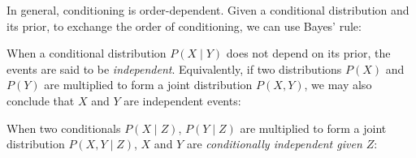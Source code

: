 \documentclass[11pt]{article}
\begin{document}
    \noindent In general, conditioning is order-dependent. Given a conditional distribution and its prior, to exchange the order of conditioning, we can use Bayes' rule:

    \begin{prooftree}
    \end{prooftree}

    \noindent When a conditional distribution $P(X \mid Y)$ does not depend on its prior, the events are said to be \textit{independent}. Equivalently, if two distributions $P(X)$ and $P(Y)$ are multiplied to form a joint distribution $P(X, Y)$, we may also conclude that $X$ and $Y$ are independent events:


    \noindent When two conditionals $P(X \mid Z)$, $P(Y \mid Z)$ are multiplied to form a joint distribution $P(X, Y \mid Z)$, $X$ and $Y$ are \textit{conditionally independent given $Z$}:

    \begin{prooftree}
    \end{prooftree}

%
\end{document}
